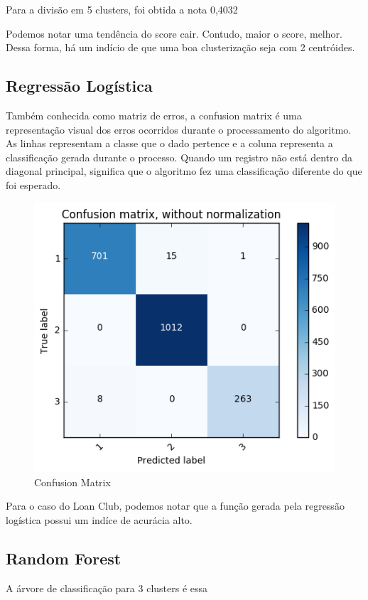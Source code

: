 Para a divisão em 5 clusters, foi obtida a nota 0,4032

Podemos notar uma tendência do score cair. Contudo, maior o score, melhor. Dessa forma, há um indício de que uma boa clusterização seja com 2 centróides.



\subsection{Regressão Logística}


Também conhecida como matriz de erros, a confusion matrix é uma representação visual dos erros ocorridos durante o processamento do algoritmo. As linhas representam a classe que o dado pertence e a coluna representa a classificação gerada durante o processo. Quando um registro não está dentro da diagonal principal, significa que o algoritmo fez uma classificação diferente do que foi esperado.

\begin{figure}[!ht]
\caption{Confusion Matrix}
\centerline{\includegraphics[width=.7\textwidth]{img/confusionMatrix}}
\end{figure}


Para o caso do Loan Club, podemos notar que a função gerada pela regressão logística possui um indíce de acurácia alto.

\subsection{Random Forest}

A árvore de classificação para 3 clusters é essa

